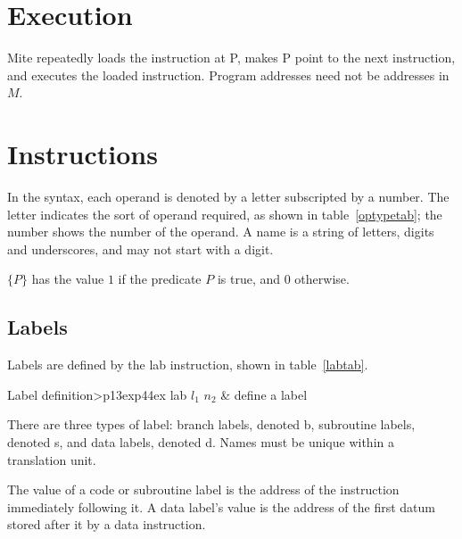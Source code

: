 \documentclass[english]{scrartcl}
\newcommand{\synfont}{\sffamily}
\newcommand{\syn}[1]{{\synfont #1}}
\newenvironment{insttab}[1]
    {\begin{ctable}{#1}{>{\synfont}p{13ex}p{44ex}}\toprule}
    {\bottomrule\end{ctable}}
\begin{document}
\section{Execution}

Mite repeatedly loads the instruction at \syn{P}, makes \syn{P} point to
the next instruction, and executes the loaded instruction. Program addresses
need not be addresses in $M$.



\section{Instructions}

In the syntax, each operand is denoted by a letter subscripted by a number.
The letter indicates the sort of operand required, as shown in
table~\ref{optypetab}; the number shows the number of the operand. A name is
a string of letters, digits and underscores, and may not start with a digit.


$\{P\}$ has the value $1$ if the predicate $P$ is true, and $0$ otherwise.


\subsection{Labels}

Labels are defined by the \syn{lab} instruction, shown in table~\ref{labtab}.

\begin{insttab}{Label definition\label{labtab}}
lab $l_1$ $n_2$        & define a label\\
\end{insttab}

There are three types of label: branch labels, denoted \syn{b}, subroutine
labels, denoted \syn{s}, and data labels, denoted \syn{d}. Names must be
unique within a translation unit.

The value of a code or subroutine label is the address of the instruction
immediately following it. A data label's value is the address of the first
datum stored after it by a data instruction.
\end{document}
